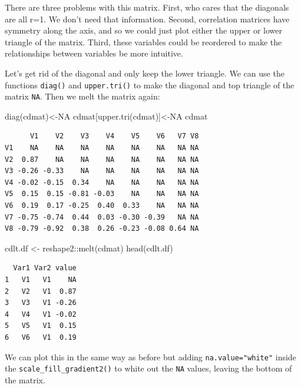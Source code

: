 \documentclass[
  letterpaper,
  DIV=11,
  numbers=noendperiod]{scrreprt}
\newenvironment{Shaded}{\begin{snugshade}}{\end{snugshade}}
\newcommand{\ConstantTok}[1]{\textcolor[rgb]{0.56,0.35,0.01}{#1}}
\newcommand{\FunctionTok}[1]{\textcolor[rgb]{0.28,0.35,0.67}{#1}}
\newcommand{\NormalTok}[1]{\textcolor[rgb]{0.00,0.23,0.31}{#1}}
\newcommand{\OtherTok}[1]{\textcolor[rgb]{0.00,0.23,0.31}{#1}}
\newcommand{\SpecialCharTok}[1]{\textcolor[rgb]{0.37,0.37,0.37}{#1}}
\begin{document}
There are three problems with this matrix. First, who cares that the
diagonals are all r=1. We don't need that information. Second,
correlation matrices have symmetry along the axis, and so we could just
plot either the upper or lower triangle of the matrix. Third, these
variables could be reordered to make the relationships between variables
be more intuitive.

Let's get rid of the diagonal and only keep the lower triangle. We can
use the functions \texttt{diag()} and \texttt{upper.tri()} to make the
diagonal and top triangle of the matrix \texttt{NA}. Then we melt the
matrix again:

\begin{Shaded}
\begin{Highlighting}[]
\FunctionTok{diag}\NormalTok{(cdmat)}\OtherTok{\textless{}{-}}\ConstantTok{NA}
\NormalTok{cdmat[}\FunctionTok{upper.tri}\NormalTok{(cdmat)]}\OtherTok{\textless{}{-}}\ConstantTok{NA}
\NormalTok{cdmat}
\end{Highlighting}
\end{Shaded}

\begin{verbatim}
      V1    V2    V3    V4    V5    V6   V7 V8
V1    NA    NA    NA    NA    NA    NA   NA NA
V2  0.87    NA    NA    NA    NA    NA   NA NA
V3 -0.26 -0.33    NA    NA    NA    NA   NA NA
V4 -0.02 -0.15  0.34    NA    NA    NA   NA NA
V5  0.15  0.15 -0.81 -0.03    NA    NA   NA NA
V6  0.19  0.17 -0.25  0.40  0.33    NA   NA NA
V7 -0.75 -0.74  0.44  0.03 -0.30 -0.39   NA NA
V8 -0.79 -0.92  0.38  0.26 -0.23 -0.08 0.64 NA
\end{verbatim}

\begin{Shaded}
\begin{Highlighting}[]
\NormalTok{cdlt.df }\OtherTok{\textless{}{-}}\NormalTok{ reshape2}\SpecialCharTok{::}\FunctionTok{melt}\NormalTok{(cdmat)}
\FunctionTok{head}\NormalTok{(cdlt.df)}
\end{Highlighting}
\end{Shaded}

\begin{verbatim}
  Var1 Var2 value
1   V1   V1    NA
2   V2   V1  0.87
3   V3   V1 -0.26
4   V4   V1 -0.02
5   V5   V1  0.15
6   V6   V1  0.19
\end{verbatim}

We can plot this in the same way as before but adding
\texttt{na.value="white"} inside the \texttt{scale\_fill\_gradient2()}
to white out the \texttt{NA} values, leaving the bottom of the matrix.
\end{document}
